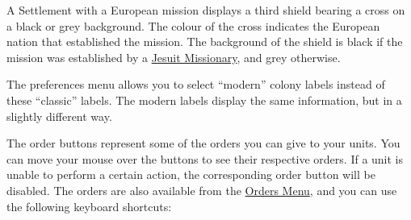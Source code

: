 \documentclass[12pt]{book}
\begin{document}
A Settlement with a European mission displays a third shield bearing a
cross on a black or grey background. The colour of the cross indicates
the European nation that established the mission. The background of
the shield is black if the mission was established by a
\hyperlink{Jesuit Missionary}{Jesuit Missionary}, and grey otherwise.

The preferences menu allows you to select ``modern'' colony labels
instead of these ``classic'' labels. The modern labels display the
same information, but in a slightly different way.

The order buttons represent some of the orders you can give to your
units. You can move your mouse over the buttons to see their
respective orders. If a unit is unable to perform a certain action,
the corresponding order button will be disabled. The orders are also
available from the \hyperlink{orders menu}{Orders Menu}, and you can
use the following \hypertarget{keyboard shortcuts}{keyboard shortcuts}:
\end{document}

